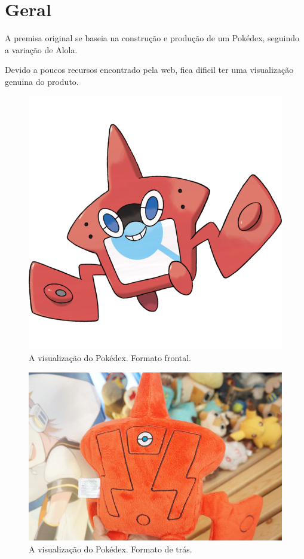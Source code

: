 \documentclass[../main.tex]{subfiles}
\begin{document}
\section{Geral}

A premisa original se baseia na construção e produção de um Pokédex, seguindo a variação de Alola. \newline

Devido a poucos recursos encontrado pela web, fica dificil ter uma visualização genuina do produto. \newline

\begin{figure}[H]
\centering
\includegraphics[scale=0.75]{../Images/Front.png}
\caption{A visualização do Pokédex. Formato frontal.}
\end{figure}

\begin{figure}[H]
\centering
\includegraphics[scale=0.25]{../Images/Back.jpg}
\caption{A visualização do Pokédex. Formato de trás.}
\end{figure}
\end{document}

